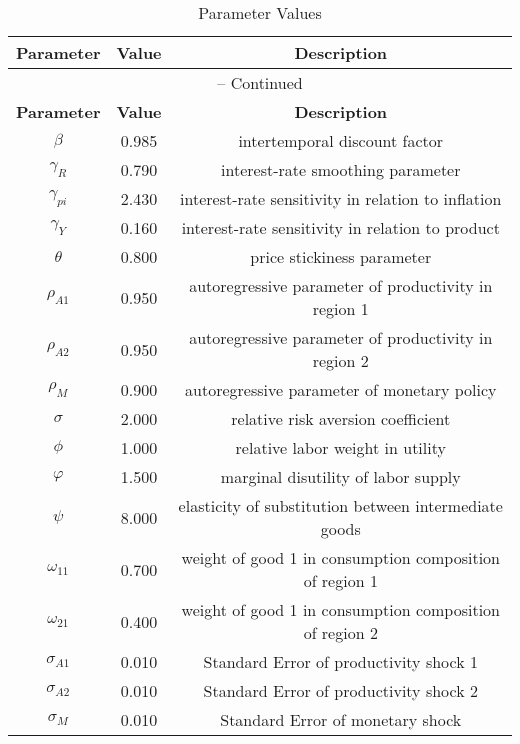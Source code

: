 \begin{center}
\begin{longtable}{ccc}
\caption{Parameter Values}\\%
\toprule%
\multicolumn{1}{c}{\textbf{Parameter}} &
\multicolumn{1}{c}{\textbf{Value}} &
 \multicolumn{1}{c}{\textbf{Description}}\\%
\midrule%
\endfirsthead
\multicolumn{3}{c}{{\tablename} \thetable{} -- Continued}\\%
\midrule%
\multicolumn{1}{c}{\textbf{Parameter}} &
\multicolumn{1}{c}{\textbf{Value}} &
  \multicolumn{1}{c}{\textbf{Description}}\\%
\midrule%
\endhead
${\beta}$ 	 & 	 0.985 	 & 	 intertemporal discount factor\\
${\gamma_{R}}$ 	 & 	 0.790 	 & 	 interest-rate smoothing parameter\\
${\gamma_{pi}}$ 	 & 	 2.430 	 & 	 interest-rate sensitivity in relation to inflation\\
${\gamma_{Y}}$ 	 & 	 0.160 	 & 	 interest-rate sensitivity in relation to product\\
${\theta}$ 	 & 	 0.800 	 & 	 price stickiness parameter\\
${\rho_{A1}}$ 	 & 	 0.950 	 & 	 autoregressive parameter of productivity in region 1\\
${\rho_{A2}}$ 	 & 	 0.950 	 & 	 autoregressive parameter of productivity in region 2\\
${\rho_{M}}$ 	 & 	 0.900 	 & 	 autoregressive parameter of monetary policy\\
${\sigma}$ 	 & 	 2.000 	 & 	 relative risk aversion coefficient\\
${\phi}$ 	 & 	 1.000 	 & 	 relative labor weight in utility\\
${\varphi}$ 	 & 	 1.500 	 & 	 marginal disutility of labor supply\\
${\psi}$ 	 & 	 8.000 	 & 	 elasticity of substitution between intermediate goods\\
${\omega_{11}}$ 	 & 	 0.700 	 & 	 weight of good 1 in consumption composition of region 1\\
${\omega_{21}}$ 	 & 	 0.400 	 & 	 weight of good 1 in consumption composition of region 2\\
${\sigma_{A1}}$ 	 & 	 0.010 	 & 	 Standard Error of productivity shock 1\\
${\sigma_{A2}}$ 	 & 	 0.010 	 & 	 Standard Error of productivity shock 2\\
${\sigma_M}$ 	 & 	 0.010 	 & 	 Standard Error of monetary shock\\
\bottomrule%
\end{longtable}
\end{center}
